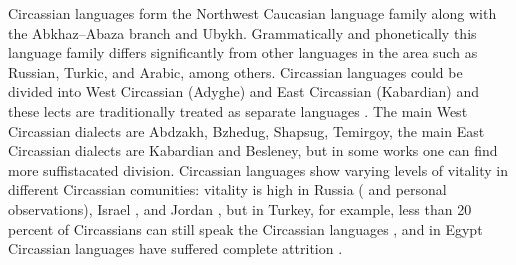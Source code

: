\par Circassian languages form the Northwest Caucasian language family along with the Abkhaz--Abaza branch and Ubykh. Grammatically and phonetically this language family differs significantly from other languages in the area such as Russian, Turkic, and Arabic, among others.  Circassian languages could be divided into West Circassian (Adyghe) and East Circassian (Kabardian) and these lects are traditionally treated as separate languages \citep{hewitt05}. The main West Circassian dialects are Abdzakh, Bzhedug,  Shapsug, Temirgoy, the main East Circassian dialects are Kabardian and Besleney, but in some works one can find more suffistacated division. Circassian languages show varying levels of vitality in different Circassian comunities: vitality is high in Russia (\citep{lalor88} and personal observations), Israel \citep{kreindler95}, and Jordan \citep{abdeljawad2006}, but in Turkey, for example, less than 20 percent of Circassians can still speak the Circassian languages \cite[130]{richmond13}, and in Egypt Circassian languages have suffered complete attrition \cite[53--54]{abdeljawad2006}.

